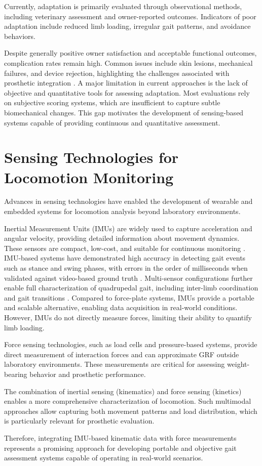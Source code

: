 Currently, adaptation is primarily evaluated through observational methods, including veterinary assessment and owner-reported outcomes. Indicators of poor adaptation include reduced limb loading, irregular gait patterns, and avoidance behaviors.

Despite generally positive owner satisfaction and acceptable functional outcomes, complication rates remain high. Common issues include skin lesions, mechanical failures, and device rejection, highlighting the challenges associated with prosthetic integration \cite{Rosen2022}.
A major limitation in current approaches is the lack of objective and quantitative tools for assessing adaptation. Most evaluations rely on subjective scoring systems, which are insufficient to capture subtle biomechanical changes. This gap motivates the development of sensing-based systems capable of providing continuous and quantitative assessment.


\section{Sensing Technologies for Locomotion Monitoring}

Advances in sensing technologies have enabled the development of wearable and embedded systems for locomotion analysis beyond laboratory environments.

Inertial Measurement Units (IMUs) are widely used to capture acceleration and angular velocity, providing detailed information about movement dynamics. These sensors are compact, low-cost, and suitable for continuous monitoring \cite{Jenkins2018}.
IMU-based systems have demonstrated high accuracy in detecting gait events such as stance and swing phases, with errors in the order of milliseconds when validated against video-based ground truth \cite{Jenkins2018}. Multi-sensor configurations further enable full characterization of quadrupedal gait, including inter-limb coordination and gait transitions \cite{Zhang2022}.
Compared to force-plate systems, IMUs provide a portable and scalable alternative, enabling data acquisition in real-world conditions. However, IMUs do not directly measure forces, limiting their ability to quantify limb loading.

Force sensing technologies, such as load cells and pressure-based systems, provide direct measurement of interaction forces and can approximate GRF outside laboratory environments. These measurements are critical for assessing weight-bearing behavior and prosthetic performance.

The combination of inertial sensing (kinematics) and force sensing (kinetics) enables a more comprehensive characterization of locomotion. Such multimodal approaches allow capturing both movement patterns and load distribution, which is particularly relevant for prosthetic evaluation.

Therefore, integrating IMU-based kinematic data with force measurements represents a promising approach for developing portable and objective gait assessment systems capable of operating in real-world scenarios.